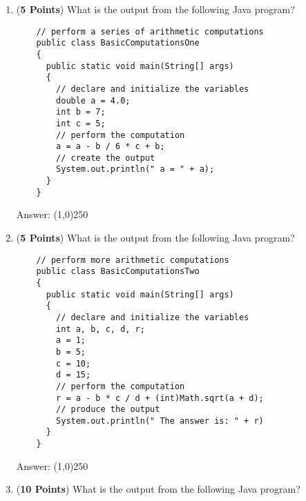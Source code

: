 \documentclass[12pt]{article}
\begin{document}
\begin{enumerate}

  \item ({\bf 5 Points}) What is the output from the following Java program?

\hspace*{.25in}
\begin{minipage}{6in}
  \lstset{numbers=left}
  \begin{lstlisting}
    // perform a series of arithmetic computations
    public class BasicComputationsOne
    {
      public static void main(String[] args)
      {
        // declare and initialize the variables
        double a = 4.0;
        int b = 7;
        int c = 5;
        // perform the computation
        a = a - b / 6 * c + b;
        // create the output
        System.out.println(" a = " + a);
      }
    }
  \end{lstlisting}

\end{minipage}

Answer: \line(1,0){250}

\newpage

\item ({\bf 5 Points}) What is the output from the following Java program?

\hspace*{.25in}
\begin{minipage}{6in}
  \lstset{numbers=left}
  \begin{lstlisting}
    // perform more arithmetic computations
    public class BasicComputationsTwo
    {
      public static void main(String[] args)
      {
        // declare and initialize the variables
        int a, b, c, d, r;
        a = 1;
        b = 5;
        c = 10;
        d = 15;
        // perform the computation
        r = a - b * c / d + (int)Math.sqrt(a + d);
        // produce the output
        System.out.println(" The answer is: " + r)
      }
    }
  \end{lstlisting}

\end{minipage}

Answer: \line(1,0){250}

\newpage

\item ({\bf 10 Points}) What is the output from the following Java program?


\end{enumerate}
\end{document}
